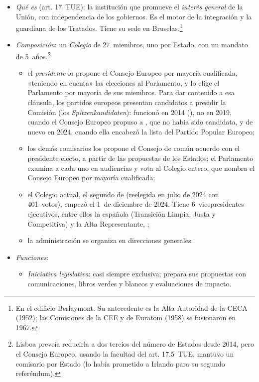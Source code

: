 \documentclass[11pt]{article}
\begin{document}
\begin{itemize}
\item \emph{Qué es} (art. 17~TUE): la institución que promueve el \emph{interés general} de la Unión, con independencia de los gobiernos. Es el motor de la integración y la guardiana de los Tratados. Tiene su sede en Bruselas.\footnote{En el edificio Berlaymont. Su antecedente es la Alta Autoridad de la CECA (1952); las Comisiones de la CEE y de Euratom (1958) se fusionaron en 1967.}
\item \emph{Composición}: un \emph{Colegio} de 27~miembros, uno por Estado, con un mandato de 5~años.\footnote{Lisboa preveía reducirla a dos tercios del número de Estados desde 2014, pero el Consejo Europeo, usando la facultad del art. 17.5~TUE, mantuvo un comisario por Estado (lo había prometido a Irlanda para su segundo referéndum).}
  \begin{itemize}
  \item el \emph{presidente} lo propone el Consejo Europeo por mayoría cualificada, «teniendo en cuenta» las elecciones al Parlamento, y lo elige el Parlamento por mayoría de sus miembros. Para dar contenido a esa cláusula, los partidos europeos presentan candidatos a presidir la Comisión (los \emph{Spitzenkandidaten}): funcionó en 2014 (), no en 2019, cuando el Consejo Europeo propuso a , que no había sido candidata, y de nuevo en 2024, cuando ella encabezó la lista del Partido Popular Europeo;
  \item los demás comisarios los propone el Consejo de común acuerdo con el presidente electo, a partir de las propuestas de los Estados; el Parlamento examina a cada uno en audiencias y vota al Colegio entero, que nombra el Consejo Europeo por mayoría cualificada;
  \item el Colegio actual, el segundo de  (reelegida en julio de 2024 con 401~votos), empezó el 1~de diciembre de 2024. Tiene 6~vicepresidentes ejecutivos, entre ellos la española  (Transición Limpia, Justa y Competitiva) y la Alta Representante, \nocite{CE2024Colegio};
  \item la administración se organiza en direcciones generales.
  \end{itemize}
\item \emph{Funciones}:
  \begin{itemize}
  \item \emph{Iniciativa legislativa}: casi siempre exclusiva; prepara sus propuestas con comunicaciones, libros verdes y blancos y evaluaciones de impacto.

\end{itemize}
\end{itemize}
\end{document}
